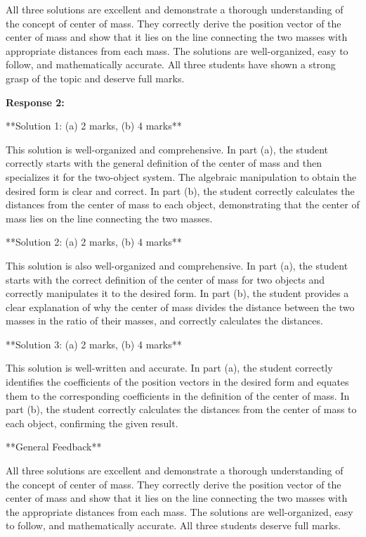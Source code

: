 \documentclass[a4paper,11pt]{article}
\begin{document}
All three solutions are excellent and demonstrate a thorough understanding of the concept of center of mass. They correctly derive the position vector of the center of mass and show that it lies on the line connecting the two masses with appropriate distances from each mass. The solutions are well-organized, easy to follow, and mathematically accurate. All three students have shown a strong grasp of the topic and deserve full marks.

\bigskip    
\textbf{Response 2:}

**Solution 1: (a) 2 marks, (b) 4 marks**

This solution is well-organized and comprehensive. In part (a), the student correctly starts with the general definition of the center of mass and then specializes it for the two-object system. The algebraic manipulation to obtain the desired form is clear and correct. In part (b), the student correctly calculates the distances from the center of mass to each object, demonstrating that the center of mass lies on the line connecting the two masses.

**Solution 2: (a) 2 marks, (b) 4 marks**

This solution is also well-organized and comprehensive. In part (a), the student starts with the correct definition of the center of mass for two objects and correctly manipulates it to the desired form. In part (b), the student provides a clear explanation of why the center of mass divides the distance between the two masses in the ratio of their masses, and correctly calculates the distances.

**Solution 3: (a) 2 marks, (b) 4 marks**

This solution is well-written and accurate. In part (a), the student correctly identifies the coefficients of the position vectors in the desired form and equates them to the corresponding coefficients in the definition of the center of mass. In part (b), the student correctly calculates the distances from the center of mass to each object, confirming the given result.

**General Feedback**

All three solutions are excellent and demonstrate a thorough understanding of the concept of center of mass. They correctly derive the position vector of the center of mass and show that it lies on the line connecting the two masses with the appropriate distances from each mass. The solutions are well-organized, easy to follow, and mathematically accurate. All three students deserve full marks.
\end{document}
